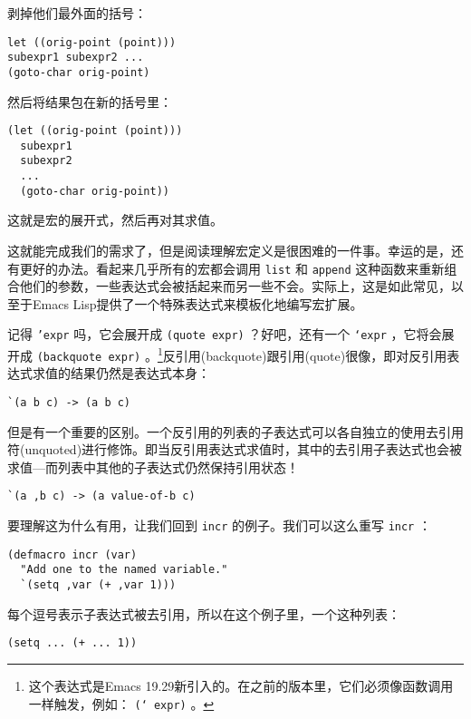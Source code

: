 剥掉他们最外面的括号：

\begin{verbatim}
let ((orig-point (point)))
subexpr1 subexpr2 ...
(goto-char orig-point)
\end{verbatim}

然后将结果包在新的括号里：

\begin{verbatim}
(let ((orig-point (point)))
  subexpr1
  subexpr2
  ...
  (goto-char orig-point))
\end{verbatim}

这就是宏的展开式，然后再对其求值。

这就能完成我们的需求了，但是阅读理解宏定义是很困难的一件事。幸运的是，还有更好的办法。看起来几乎所有的宏都会调用 \texttt{list} 和 \texttt{append} 这种函数来重新组合他们的参数，一些表达式会被括起来而另一些不会。实际上，这是如此常见，以至于Emacs Lisp提供了一个特殊表达式来模板化地编写宏扩展。

记得 \texttt{'expr} 吗，它会展开成 \texttt{(quote expr)} ？好吧，还有一个 \texttt{`expr} ，它将会展开成 \texttt{(backquote expr)} 。\footnote{这个表达式是Emacs 19.29新引入的。在之前的版本里，它们必须像函数调用一样触发，例如： \texttt{(` expr)} 。}反引用(backquote)跟引用(quote)很像，即对反引用表达式求值的结果仍然是表达式本身：

\begin{verbatim}
`(a b c) -> (a b c)
\end{verbatim}

但是有一个重要的区别。一个反引用的列表的子表达式可以各自独立的使用去引用符(unquoted)进行修饰。即当反引用表达式求值时，其中的去引用子表达式也会被求值---而列表中其他的子表达式仍然保持引用状态！

\begin{verbatim}
`(a ,b c) -> (a value-of-b c)
\end{verbatim}

要理解这为什么有用，让我们回到 \texttt{incr} 的例子。我们可以这么重写 \texttt{incr} ：

\begin{verbatim}
(defmacro incr (var)
  "Add one to the named variable."
  `(setq ,var (+ ,var 1)))
\end{verbatim}

每个逗号表示子表达式被去引用，所以在这个例子里，一个这种列表：

\begin{verbatim}
(setq ... (+ ... 1))
\end{verbatim}

